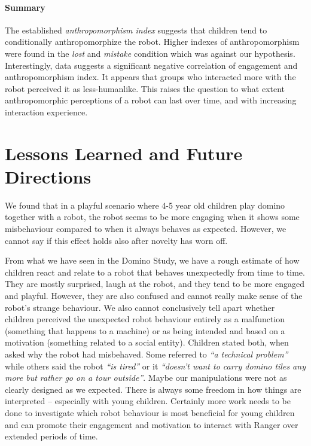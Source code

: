 \documentclass{sig-alternate}
\begin{document}
\paragraph{Summary}

The established \textit{anthropomorphism index} suggests that children tend to
conditionally anthropomorphize the robot. Higher indexes of anthropomorphism
were found in the \textit{lost} and \textit{mistake} condition which was against
our hypothesis. Interestingly, data suggests a significant negative correlation
of engagement and anthropomorphism index. It appears that groups who interacted
more with the robot perceived it as less-humanlike. This raises the question to
what extent anthropomorphic perceptions of a robot can last over time, and with
increasing interaction experience.


\section{Lessons Learned and Future Directions}


We found that in a playful scenario where 4-5 year old children play domino
together with a robot, the robot seems to be more engaging when it shows some
misbehaviour compared to when it always behaves as expected. However, we
cannot say if this effect holds also after novelty has worn off.

From what we
have seen in the Domino Study, we have a rough estimate of how children react
and relate to a robot that behaves unexpectedly from time to time. They are
mostly surprised, laugh at the robot, and they tend to be more engaged and
playful. However, they are also confused and cannot really make sense of the
robot's strange behaviour. We also cannot conclusively tell apart whether children perceived
the unexpected robot behaviour entirely as a malfunction (something that happens
to a machine) or as being intended and based on a motivation (something related
to a social entity). Children stated both, when asked why the robot had
misbehaved. Some referred to \textit{``a technical problem''} while others said
the robot \textit{``is tired''} or it \textit{``doesn't want to carry domino
tiles any more but rather go on a tour outside''}. Maybe our manipulations were
not as clearly designed as we expected. There is always some freedom in how
things are interpreted -- especially with young children.  Certainly more work
needs to be done to investigate which robot behaviour is most beneficial for
young children and can promote their engagement and motivation to interact with
Ranger over extended periods of time.  
\end{document}
